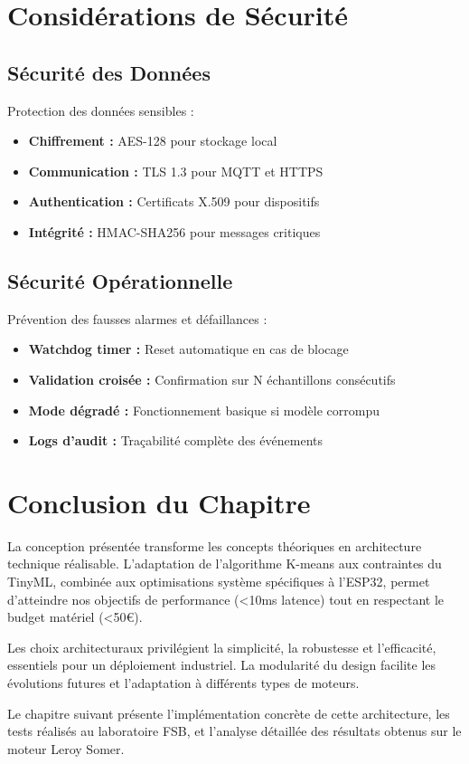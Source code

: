 \section{Considérations de Sécurité}

\subsection{Sécurité des Données}

Protection des données sensibles :

\begin{itemize}
    \item \textbf{Chiffrement :} AES-128 pour stockage local
    \item \textbf{Communication :} TLS 1.3 pour MQTT et HTTPS
    \item \textbf{Authentication :} Certificats X.509 pour dispositifs
    \item \textbf{Intégrité :} HMAC-SHA256 pour messages critiques
\end{itemize}

\subsection{Sécurité Opérationnelle}

Prévention des fausses alarmes et défaillances :

\begin{itemize}
    \item \textbf{Watchdog timer :} Reset automatique en cas de blocage
    \item \textbf{Validation croisée :} Confirmation sur N échantillons consécutifs
    \item \textbf{Mode dégradé :} Fonctionnement basique si modèle corrompu
    \item \textbf{Logs d'audit :} Traçabilité complète des événements
\end{itemize}

\section{Conclusion du Chapitre}

La conception présentée transforme les concepts théoriques en architecture technique réalisable. L'adaptation de l'algorithme K-means aux contraintes du TinyML, combinée aux optimisations système spécifiques à l'ESP32, permet d'atteindre nos objectifs de performance (<10ms latence) tout en respectant le budget matériel (<50€).

Les choix architecturaux privilégient la simplicité, la robustesse et l'efficacité, essentiels pour un déploiement industriel. La modularité du design facilite les évolutions futures et l'adaptation à différents types de moteurs.

Le chapitre suivant présente l'implémentation concrète de cette architecture, les tests réalisés au laboratoire FSB, et l'analyse détaillée des résultats obtenus sur le moteur Leroy Somer.